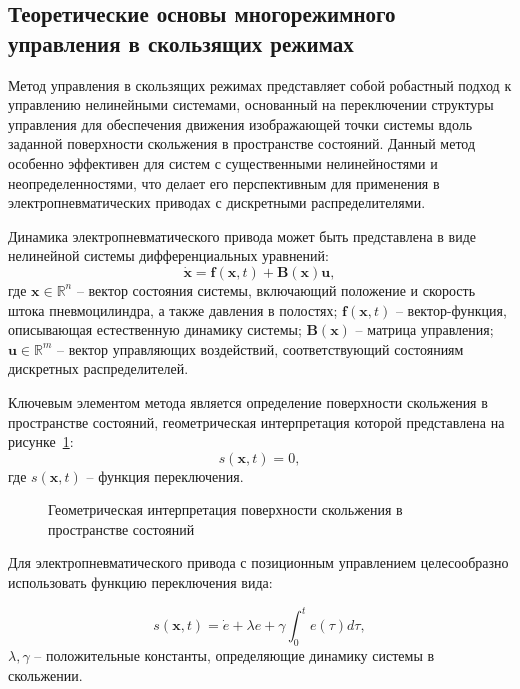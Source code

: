 \subsection{Теоретические основы многорежимного управления в скользящих режимах}\label{subsec:ch3/sec3/sub1}

Метод управления в скользящих режимах представляет собой робастный подход к управлению нелинейными системами,
основанный на переключении структуры управления для обеспечения движения изображающей точки системы вдоль заданной поверхности скольжения в
пространстве состояний. Данный метод особенно эффективен для систем с существенными нелинейностями и неопределенностями, что делает его
перспективным для применения в электропневматических приводах с дискретными распределителями.

Динамика электропневматического привода может быть представлена в виде нелинейной системы дифференциальных уравнений:
\begin{equation*}
\dot{\mathbf{x}} = \mathbf{f}(\mathbf{x}, t) + \mathbf{B}(\mathbf{x})\mathbf{u},
\end{equation*}
где $\mathbf{x} \in \mathbb{R}^n$ -- вектор состояния системы, включающий положение и скорость штока пневмоцилиндра, а также давления в полостях;
$\mathbf{f}(\mathbf{x}, t)$ -- вектор-функция, описывающая естественную динамику системы;
$\mathbf{B}(\mathbf{x})$ -- матрица управления; $\mathbf{u} \in \mathbb{R}^m$ -- вектор управляющих воздействий, соответствующий состояниям дискретных распределителей.

Ключевым элементом метода является определение поверхности скольжения в пространстве состояний, геометрическая интерпретация которой представлена на рисунке~\ref{fig:phase_plane}:
\begin{equation*}
s(\mathbf{x}, t) = 0,
\end{equation*}
где $s(\mathbf{x}, t)$ -- функция переключения.

\begin{figure}[ht]
	\caption{Геометрическая интерпретация поверхности скольжения в пространстве состояний}
	\label{fig:phase_plane}
\end{figure}

Для электропневматического привода с позиционным управлением целесообразно использовать функцию переключения вида:

\begin{equation*}
s(\mathbf{x}, t) = \dot{e} + \lambda e + \gamma\int_{0}^{t}e(\tau)d\tau,
\end{equation*}
$\lambda, \gamma$ -- положительные константы, определяющие динамику системы в скольжении.

